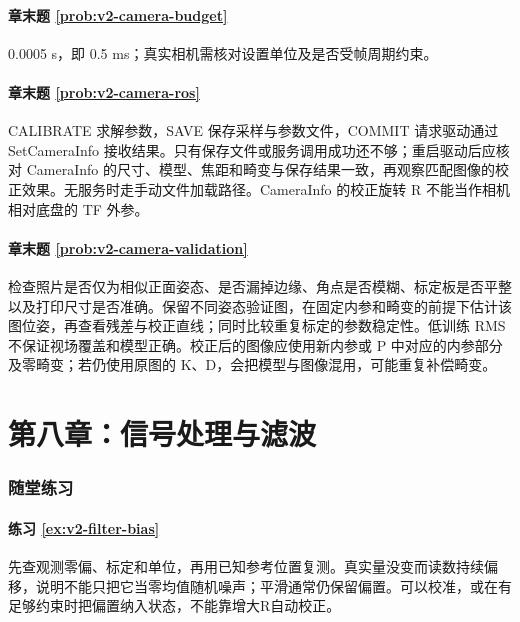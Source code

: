 \paragraph*{章末题 \ref{prob:v2-camera-budget}}
\begin{solution}
0.0005 s，即 0.5 ms；真实相机需核对设置单位及是否受帧周期约束。
\end{solution}

\paragraph*{章末题 \ref{prob:v2-camera-ros}}
\begin{solution}
CALIBRATE 求解参数，SAVE 保存采样与参数文件，COMMIT 请求驱动通过 SetCameraInfo 接收结果。只有保存文件或服务调用成功还不够；重启驱动后应核对 CameraInfo 的尺寸、模型、焦距和畸变与保存结果一致，再观察匹配图像的校正效果。无服务时走手动文件加载路径。CameraInfo 的校正旋转 R 不能当作相机相对底盘的 TF 外参。
\end{solution}

\paragraph*{章末题 \ref{prob:v2-camera-validation}}
\begin{solution}
检查照片是否仅为相似正面姿态、是否漏掉边缘、角点是否模糊、标定板是否平整以及打印尺寸是否准确。保留不同姿态验证图，在固定内参和畸变的前提下估计该图位姿，再查看残差与校正直线；同时比较重复标定的参数稳定性。低训练 RMS 不保证视场覆盖和模型正确。校正后的图像应使用新内参或 P 中对应的内参部分及零畸变；若仍使用原图的 K、D，会把模型与图像混用，可能重复补偿畸变。
\end{solution}

\section*{第八章：信号处理与滤波}
{}
\subsubsection*{随堂练习}

\paragraph*{练习 \ref{ex:v2-filter-bias}}
\begin{solution}
先查观测零偏、标定和单位，再用已知参考位置复测。真实量没变而读数持续偏移，说明不能只把它当零均值随机噪声；平滑通常仍保留偏置。可以校准，或在有足够约束时把偏置纳入状态，不能靠增大R自动校正。
\end{solution}

